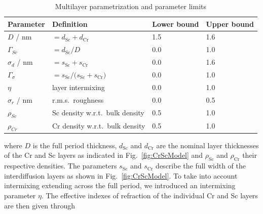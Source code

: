 \documentclass{iucr}              %
\begin{document}
\begin{table}
\centering
\caption{Multilayer parametrization and parameter limits}
\label{tbl:parametrization}
\begin{tabular}{@{}llll@{}}
\toprule
Parameter & Definition & Lower bound & Upper bound\\ \midrule
$D$ / nm & $= d_\text{Sc} + d_\text{Cr}$ & 1.5&1.6 \\ 
$\Gamma_{Sc}$ & $= d_\text{Sc} / D$&0.0 &1.0 \\ 
$\sigma_d$ / nm&$=s_\text{Sc} + s_\text{Cr}$&0.0 & 1.6\protect\footnotemark\\ 
$\Gamma_\sigma$ &$= s_\text{Sc} / \big(s_\text{Sc} + s_\text{Cr}\big)$& 0.0& 1.0\\ 
$\eta$ &layer intermixing& 0.0& 1.0\\ 
$\sigma_r$ / nm & r.m.s.~roughness& 0.0& 0.5\\ 
$\rho_{Sc}$ &Sc density w.r.t.~bulk density & 0.5& 1.0\\ 
$\rho_{Cr}$ &Cr density w.r.t.~bulk density& 0.5& 1.0\\ 
 \bottomrule
\end{tabular}
\end{table}
where $D$ is the full period thickness, $d_\text{Sc}$ and $d_\text{Cr}$ are the nominal layer thicknesses of the Cr and Sc layers as indicated in Fig.~\ref{fig:CrScModel} and $\rho_\text{Sc}$ and $\rho_\text{Cr}$ their respective densities. The parameters $s_\text{Sc}$ and $s_\text{Cr}$ describe the full width of the interdiffusion layers as shown in Fig.~\ref{fig:CrScModel}. To take into account intermixing extending across the full period, we introduced an intermixing parameter $\eta$. The effective indexes of refraction of the individual Cr and Sc layers are then given through
\end{document}
